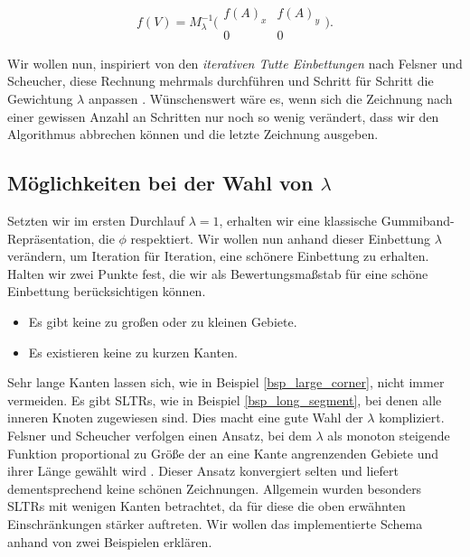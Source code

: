 $$f(V) = M_{\lambda}^{-1}\big( \begin{smallmatrix}f(A)_x&f(A)_y\\ 0&0\end{smallmatrix} \big).$$

Wir wollen nun, inspiriert von den \textit{iterativen Tutte Einbettungen} nach Felsner und Scheucher, diese Rechnung mehrmals durchführen und Schritt für Schritt die Gewichtung $\lambda$ anpassen \cite{fs17}. Wünschenswert wäre es, wenn sich die Zeichnung nach einer gewissen Anzahl an Schritten nur noch so wenig verändert, dass wir den Algorithmus abbrechen können und die letzte Zeichnung ausgeben.

\subsection{Möglichkeiten bei der Wahl von $\lambda$}

Setzten wir im ersten Durchlauf $\lambda = 1$, erhalten wir eine klassische Gummiband-Repräsentation, die $\phi$ respektiert. Wir wollen nun anhand dieser Einbettung $\lambda$ verändern, um Iteration für Iteration, eine \glqq schönere\grqq{ } Einbettung zu erhalten. Halten wir zwei Punkte fest, die wir als Bewertungsmaßstab für eine schöne Einbettung berücksichtigen können.

\begin{itemize}
\item Es gibt keine zu großen oder zu kleinen Gebiete.
\item Es existieren keine zu kurzen Kanten.
\end{itemize}

Sehr lange Kanten lassen sich, wie in Beispiel \ref{bsp_large_corner}, nicht immer vermeiden. Es gibt SLTRs, wie in Beispiel \ref{bsp_long_segment}, bei denen alle inneren Knoten zugewiesen sind. Dies macht eine gute Wahl der $\lambda$ kompliziert. Felsner und Scheucher verfolgen einen Ansatz, bei dem $\lambda$ als monoton steigende Funktion proportional zu Größe der an eine Kante angrenzenden Gebiete und ihrer Länge gewählt wird \cite{fs17}. Dieser Ansatz konvergiert selten und liefert dementsprechend keine schönen Zeichnungen. Allgemein wurden besonders SLTRs mit wenigen Kanten betrachtet, da für diese die oben erwähnten Einschränkungen stärker auftreten. Wir wollen das implementierte  Schema anhand von zwei Beispielen erklären.

